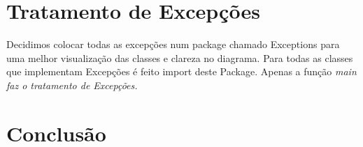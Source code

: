 \documentclass{article}
\begin{document}
\pagebreak
\section{Tratamento de Excepções}
\quad Decidimos colocar todas as excepções num package chamado Exceptions para uma melhor visualização das classes e
clareza no diagrama. Para todas as classes que implementam Excepções é feito import deste Package. Apenas a função
\em main faz o tratamento de Excepções.
\pagebreak
\section{Conclusão}
\end{document}
